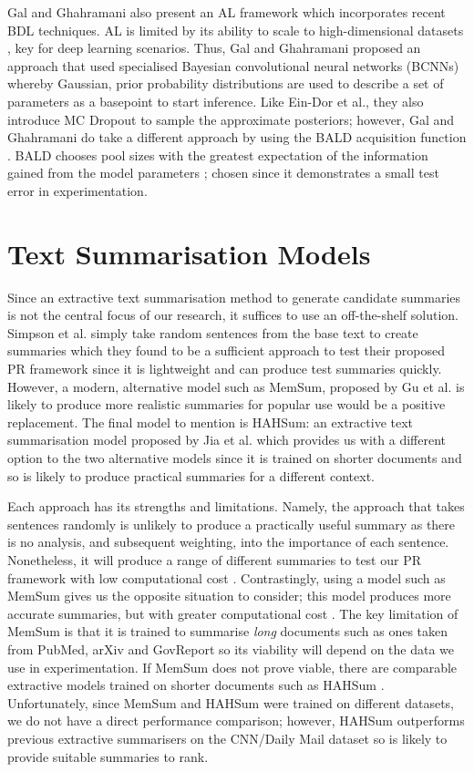 \documentclass[ %
                    author={James Stephenson},
                supervisor={Dr. Edwin Simpson},
                    degree={MSc},
                     title={PROJECT PLAN},
                  subtitle={Bayesian Deep Learning For Extractive Test Summarisation},
                      type={},
                      year={2022}]{../additions/dissertation}
\begin{document}
		\medbreak
		Gal and Ghahramani \cite{Gal17} also present an AL framework which incorporates recent BDL techniques. AL is limited by its ability to scale to high-dimensional datasets \cite{Tong01}, key for deep learning scenarios. Thus, Gal and Ghahramani proposed an approach that used specialised Bayesian convolutional neural networks (BCNNs) whereby Gaussian, prior probability distributions are used to describe a set of parameters as a basepoint to start inference. Like Ein-Dor et al., they also introduce MC Dropout to sample the approximate posteriors; however, Gal and Ghahramani do take a different approach by using the BALD acquisition function \cite{Houlsby11}. BALD chooses pool sizes with the greatest expectation of the information gained from the model parameters \cite{Gal17}; chosen since it demonstrates a small test error in experimentation.

		\section{Text Summarisation Models}
		\label{chap:literaturereview:summodels}
		
		Since an extractive text summarisation method to generate candidate summaries is not the central focus of our research, it suffices to use an off-the-shelf solution. Simpson et al. \cite{Simpson19} simply take random sentences from the base text to create summaries which they found to be a sufficient approach to test their proposed PR framework since it is lightweight and can produce test summaries quickly. However, a modern, alternative model such as MemSum, proposed by Gu et al. \cite{Gu22} is likely to produce more realistic summaries for popular use would be a positive replacement. The final model to mention is HAHSum: an extractive text summarisation model proposed by Jia et al. \cite{Jia20} which provides us with a different option to the two alternative models since it is trained on shorter documents and so is likely to produce practical summaries for a different context.
		
		\medbreak
		Each approach has its strengths and limitations. Namely, the approach that takes sentences randomly is unlikely to produce a practically useful summary as there is no analysis, and subsequent weighting, into the importance of each sentence. Nonetheless, it will produce a range of different summaries to test our PR framework with low computational cost \cite{Simpson19}. Contrastingly, using a model such as MemSum gives us the opposite situation to consider; this model produces more accurate summaries, but with greater computational cost \cite{Gu22}. The key limitation of MemSum is that it is trained to summarise \emph{long} documents such as ones taken from PubMed, arXiv and GovReport so its viability will depend on the data we use in experimentation. If MemSum does not prove viable, there are comparable extractive models trained on shorter documents such as HAHSum \cite{Jia20}. Unfortunately, since MemSum and HAHSum were trained on different datasets, we do not have a direct performance comparison; however, HAHSum outperforms previous extractive summarisers on the CNN/Daily Mail dataset \cite{Nallapati16, Jia20} so is likely to provide suitable summaries to rank.
		
\end{document}
